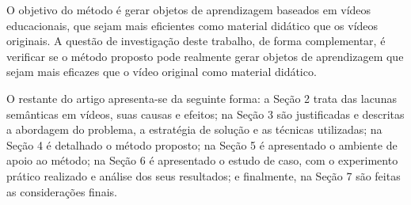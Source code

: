 O objetivo do método é gerar objetos de aprendizagem baseados em vídeos educacionais, que sejam mais eficientes como material didático que os vídeos originais. A questão de investigação deste trabalho, de forma complementar, é verificar se o método proposto pode realmente gerar objetos de aprendizagem que sejam mais eficazes que o vídeo original como material didático.

O restante do artigo apresenta-se da seguinte forma: a Seção 2 trata das lacunas semânticas em vídeos, suas causas e efeitos; na Seção 3 são justificadas e descritas a abordagem do problema, a estratégia de solução e as técnicas utilizadas; na Seção 4 é detalhado o método proposto; na Seção 5 é apresentado o ambiente de apoio ao método; na Seção 6 é apresentado o estudo de caso, com o experimento prático realizado e análise dos seus resultados; e finalmente, na Seção 7 são feitas as considerações finais.


